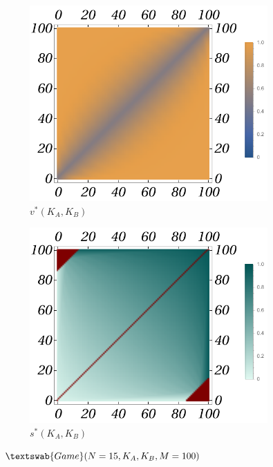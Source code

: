 \documentclass{article}
\theoremstyle{definition}
\newcommand{\G}[1]{$\textswab{Game}(#1)$}
\begin{document}
\begin{figure}[H]
    \centering
    \begin{subfigure}[b]{0.3\textwidth}
        \includegraphics[width=\textwidth]{img/v_Plot_15_100.pdf}
        \caption{$v^*(K_A,K_B)$}
        \label{fig:sub16}
    \end{subfigure}
    \hspace{0.05\textwidth} %
    \begin{subfigure}[b]{0.3\textwidth}
        \includegraphics[width=\textwidth]{img/s_Plot_15_100.pdf}
        \caption{$s^*(K_A,K_B)$}
        \label{fig:sub26}
    \end{subfigure}
    
    \caption{\G{N=15,K_A,K_B,M=100}}
    \label{fig:Game15__100_vs}
\end{figure}
\end{document}
